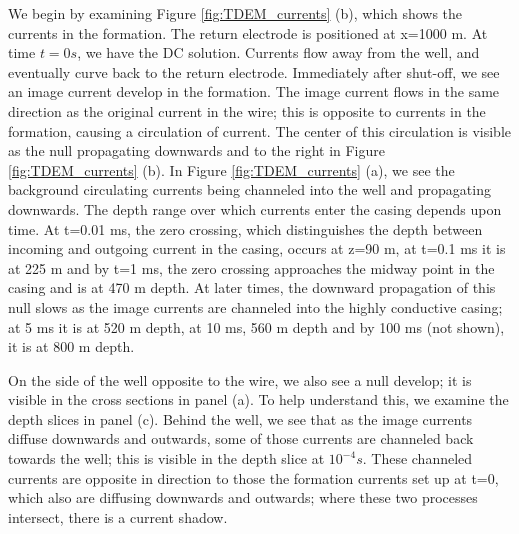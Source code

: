 \documentclass[preprint,review,3p,times,onecolumn,authoryear]{elsarticle}
\begin{document}
We begin by examining Figure \ref{fig:TDEM_currents} (b), which shows the currents in the formation. The return electrode is positioned at x=1000 m. At time $t=0s$, we have the DC solution. Currents flow away from the well, and eventually curve back to the return electrode. Immediately after shut-off, we see an image current develop in the formation. The image current flows in the same direction as the original current in the wire; this is opposite to currents in the formation, causing a circulation of current. The center of this circulation is visible as the null propagating downwards and to the right in Figure \ref{fig:TDEM_currents} (b). In Figure \ref{fig:TDEM_currents} (a), we see the background circulating currents being channeled into the well and propagating downwards. The depth range over which currents enter the casing depends upon time. At t=0.01 ms, the zero crossing, which distinguishes the depth between incoming and outgoing current in the casing, occurs at z=90 m, at t=0.1 ms it is at 225 m and by t=1 ms, the zero crossing approaches the midway point in the casing and is at 470 m depth. At later times, the downward propagation of this null slows as the image currents are channeled into the highly conductive casing; at 5 ms it is at 520 m depth, at 10 ms, 560 m depth and by 100 ms (not shown), it is at 800 m depth.

On the side of the well opposite to the wire, we also see a null develop; it is visible in the cross sections in panel (a). To help understand this, we examine the depth slices in panel (c). Behind the well, we see that as the image currents diffuse downwards and outwards, some of those currents are channeled back towards the well; this is visible in the depth slice at $10^{-4} s$. These channeled currents are opposite in direction to those the formation currents set up at t=0, which also are diffusing downwards and outwards; where these two processes intersect, there is a current shadow.
\end{document}

